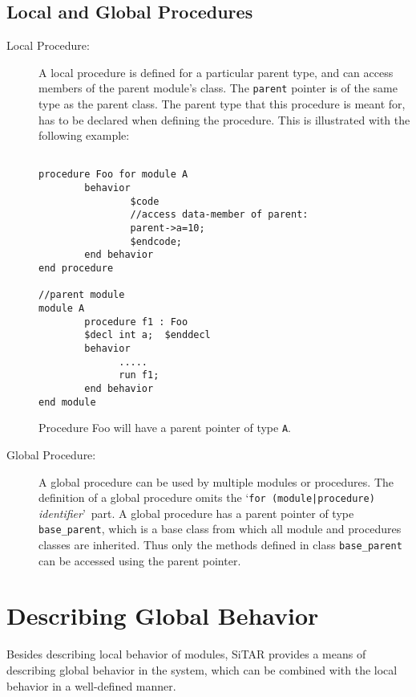 	\subsection{Local and Global Procedures}
	\begin{description}
	\item[Local Procedure:] A local procedure is defined for a
	particular parent type, and can access members of the parent module's class.
	The \texttt{parent} pointer is of the same type as the parent class.
	The parent type that this procedure is meant for, has to be declared when defining
	the procedure. This is illustrated with the following example:
        
\begin{verbatim}

procedure Foo for module A
        behavior 
                $code 
                //access data-member of parent:
                parent->a=10;
                $endcode;
        end behavior
end procedure

//parent module
module A
        procedure f1 : Foo
        $decl int a;  $enddecl
        behavior 
              .....
              run f1;
        end behavior
end module
\end{verbatim}
	Procedure Foo will have a parent pointer of type \texttt{A}.

	\item[Global Procedure:] 
	A global procedure can be used by multiple modules or procedures.
	The definition of a global procedure omits
	the \lq\texttt{for (module|procedure)} \textit{identifier}\rq\  
	part. A global procedure has a parent pointer of type
	\texttt{base\_parent}, which is a base class from which all module 
	and procedures classes are inherited. Thus only the methods defined 
	in class \texttt{base\_parent} can be accessed using the parent pointer.
	\end{description}



		
	\section{Describing Global Behavior}
	Besides describing local behavior of modules, SiTAR provides a means of
	describing global behavior in the system, which can be combined with the 
	local behavior in a well-defined manner.


